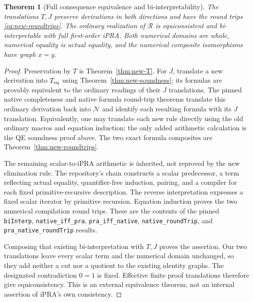 \documentclass[11pt,a4paper]{article}
\newtheorem{theorem}{Theorem}[section]
\theoremstyle{definition}
\begin{document}
\begin{theorem}[Full consequence equivalence and bi-interpretability]
\label{thm:new-biinterpretability}
The translations $T,J$ preserve derivations in both directions and have the
round trips \eqref{eq:new-roundtrips}.  The ordinary realization of
$\mathcal R$ is equiconsistent and bi-interpretable with full first-order
iPRA.  Both numerical domains are whole, numerical equality is actual
equality, and the numerical composite isomorphisms have graph $x=y$.
\end{theorem}
\begin{proof}
Preservation by $T$ is Theorem~\ref{thm:new-T}.  For $J$, translate a new
derivation into $T_{\rm eq}$ using Theorem~\ref{thm:new-soundness}; its
formulas are provably equivalent to the ordinary readings of their $J$
translations.  The pinned
native completeness and native formula round-trip theorems translate this
ordinary derivation back into $\mathcal N$ and identify each resulting
formula with its $J$ translation.  Equivalently, one may translate each new
rule directly using the old ordinary macros and equation induction; the
only added arithmetic calculation is the QE soundness proof above.
The two exact formula composites are Theorem~\ref{thm:new-roundtrips}.

The remaining scalar-to-iPRA arithmetic is inherited, not reproved by the
new elimination rule.  The repository's chain constructs a scalar
predecessor, a term reflecting actual equality, quantifier-free induction,
pairing, and a compiler for each fixed primitive-recursive description.
The reverse interpretation expresses a fixed scalar iterator by primitive
recursion.  Equation induction proves the two numerical compilation round
trips.  These are the contents of the pinned \texttt{biInterp},
\texttt{native\_iff\_pra}, \texttt{pra\_iff\_native},
\texttt{native\_roundTrip}, and \texttt{pra\_native\_roundTrip} results.\cite{native,bridge}

Composing that existing bi-interpretation with $T,J$ proves the assertion.
Our two translations leave every scalar term and the numerical domain
unchanged, so they add neither a cut nor a quotient to the existing
identity graphs.  The designated contradiction $0=1$ is fixed.  Effective
finite proof translations therefore give equiconsistency.  This is an
external equivalence theorem, not an internal assertion of iPRA's own
consistency.
\end{proof}
\end{document}
